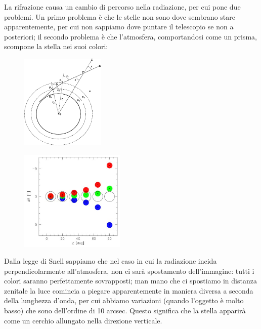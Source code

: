 La rifrazione causa un cambio di percorso nella radiazione, per cui pone due problemi. Un primo problema è che le stelle non sono dove sembrano stare apparentemente, per cui non sappiamo dove puntare il telescopio se non a posteriori; il secondo problema è che l'atmosfera, comportandosi come un prisma, scompone la stella nei suoi colori:

\begin{minipage}{0.5\textwidth}
    \begin{figure}[H]
        \centering
        \includegraphics[width=4cm]{immagini/legge_di_snell.png}
    \end{figure}
\end{minipage}
\begin{minipage}{0.5\textwidth}
    \begin{figure}[H]
        \centering
        \includegraphics[width=5cm]{immagini/spostamento_colori_atmosfera.png}
    \end{figure}
\end{minipage}

\vspace{0.2cm}Dalla legge di Snell sappiamo che nel caso in cui la radiazione incida perpendicolarmente all'atmosfera, non ci sarà spostamento dell'immagine: tutti i colori saranno perfettamente sovrapposti; man mano che ci spostiamo in distanza zenitale la luce comincia a piegare apparentemente in maniera diversa a seconda della lunghezza d'onda, per cui abbiamo variazioni (quando l'oggetto è molto basso) che sono dell'ordine di 10 arcsec. Questo significa che la stella apparirà come un cerchio allungato nella direzione verticale.


